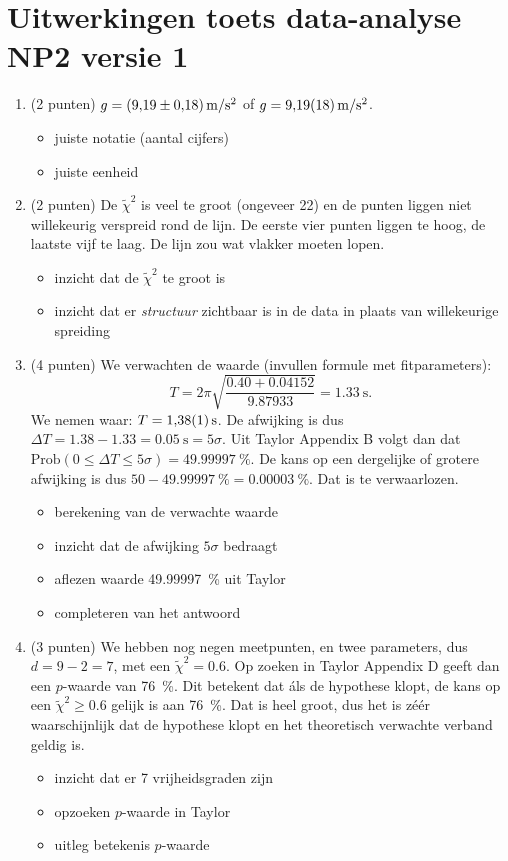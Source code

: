 \documentclass[a4paper,11pt]{article}
\begin{document}
\section*{Uitwerkingen toets data-analyse NP2 versie 1}

\begin{enumerate}
  \item (2 punten) $g = \SI[separate-uncertainty=true]{9,19 +- 0,18}{\meter\per\second\squared}$ of $g = \SI[separate-uncertainty=false]{9,19 +- 0,18}{\meter\per\second\squared}$.
  \begin{itemize}
    \item juiste notatie (aantal cijfers)
    \item juiste eenheid
  \end{itemize}
  \item (2 punten) De $\tilde\chi^2$ is veel te groot (ongeveer 22) en de punten liggen niet willekeurig verspreid rond de lijn. De eerste vier punten liggen te hoog, de laatste vijf te laag. De lijn zou wat vlakker moeten lopen.
  \begin{itemize}
    \item inzicht dat de $\tilde\chi^2$ te groot is
    \item inzicht dat er \emph{structuur} zichtbaar is in de data in plaats van willekeurige spreiding
  \end{itemize}
  \item (4 punten) We verwachten de waarde (invullen formule met fitparameters):
  \begin{equation*}
    T = 2\pi\sqrt{\frac{\num{0,40} + \num{0,04152}}{\num{9,87933}}} = \SI{1,33}{\second}.
  \end{equation*}
  We nemen waar: $T = \SI{1,38 +- 0,01}{\second}$. De afwijking is dus $\Delta T = \num{1,38} - \num{1,33} = \SI{0,05}{\second} = 5\sigma$. Uit Taylor Appendix B volgt dan dat $\text{Prob}(0 \leq \Delta T \leq 5\sigma) = \SI{49,99997}{\percent}.$ De kans op een dergelijke of grotere afwijking is dus $50 - \SI{49,99997}{\percent} = \SI{0,00003}{\percent}$. Dat is te verwaarlozen.
  \begin{itemize}
    \item berekening van de verwachte waarde
    \item inzicht dat de afwijking $5\sigma$ bedraagt
    \item aflezen waarde \SI{49,99997}{\percent} uit Taylor
    \item completeren van het antwoord
  \end{itemize}
  \item (3 punten) We hebben nog negen meetpunten, en twee parameters, dus $d = 9 - 2 = 7$, met een $\tilde\chi^2 = \num{0,6}$. Op zoeken in Taylor Appendix D geeft dan een $p$-waarde van \SI{76}{\percent}. Dit betekent dat áls de hypothese klopt, de kans op een $\tilde\chi^2 \geq \num{0,6}$ gelijk is aan \SI{76}{\percent}. Dat is heel groot, dus het is zéér waarschijnlijk dat de hypothese klopt en het theoretisch verwachte verband geldig is.
  \begin{itemize}
    \item inzicht dat er 7 vrijheidsgraden zijn
    \item opzoeken $p$-waarde in Taylor
    \item uitleg betekenis $p$-waarde
  \end{itemize}
\end{enumerate}
\end{document}
